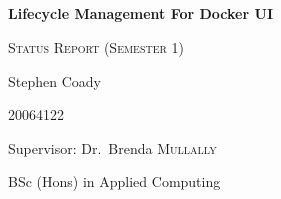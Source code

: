 \begin{titlepage}
	\mbox{}\\
	\mbox{}\\
	\mbox{}\\
	\mbox{}\\
	{\huge\bfseries Lifecycle Management For Docker UI\par}
	\vspace{1cm}
	{\scshape\large Status Report (Semester 1)\par}
	\vspace{3cm}
	{\Large Stephen Coady\par}
	{\Large 20064122\par}
	\vfill
	{\Large Supervisor: Dr.~Brenda \textsc{Mullally}}
	\vspace{2cm}\par
	{\Large BSc (Hons) in Applied Computing\par}


	\vfill
	
\end{titlepage}
